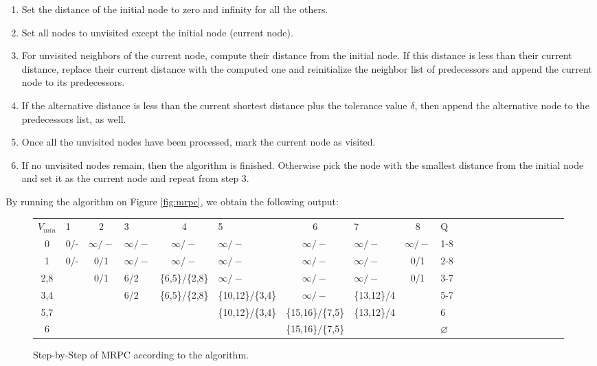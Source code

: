 \begin{enumerate}
 \item Set the distance of the initial node to zero and infinity for all the
others.
 \item Set all nodes to unvisited except the initial node (current node).
 \item For unvisited neighbors of the current node, compute their distance from
the initial node. If this distance is less than their current distance, replace
their current distance with the computed one and reinitialize the neighbor list
of predecessors and append the current node to its predecessors.
 \item If the alternative distance is less than the current shortest distance
plus the tolerance value $\delta$, then append the alternative node to the
predecessors list, as well.
 \item Once all the unvisited nodes have been processed, mark the current node as
visited. 
 \item If no unvisited nodes remain, then the algorithm is finished. Otherwise
pick the node with the smallest distance from the initial node and set it as the
current node and repeat from step 3.
\end{enumerate}

\pagebreak
By running the algorithm on Figure \ref{fig:mrpc}, we obtain the following
output:

\begin{figure}[htbp!]
 \begin{center}
 \setlength{\tabcolsep}{.5pt}
\begin{tabular*}{\textwidth}{@{\extracolsep{\fill}}clclclclclclclclclclc}
$V_{min}$ & 1 & 2 & 3 & 4 & 5 & 6 & 7 & 8 & Q\\
0 & 0/- & $\infty/-$ & $\infty/-$ & $\infty/-$ & $\infty/-$ & $\infty/-$ &
$\infty/-$ & $\infty/-$ & 1-8\\
1 & 0/- & 0/1 & $\infty/-$ & $\infty/-$ & $\infty/-$ & $\infty/-$ & $\infty/-$ &
0/1 & 2-8\\
2,8 &  & 0/1 & 6/2 & \{6,5\}/\{2,8\} & $\infty/-$ & $\infty/-$ & $\infty/-$ &
0/1 & 3-7\\
3,4 &  & & 6/2 & \{6,5\}/\{2,8\} & \{10,12\}/\{3,4\} & $\infty/-$ &  \{13,12\}/4
&  & 5-7\\
5,7 &  &  &  &  & \{10,12\}/\{3,4\} & \{15,16\}/\{7,5\} & \{13,12\}/4 &  & 6\\
6 &  &  &  & &  & \{15,16\}/\{7,5\} & &  & $\varnothing$
\end{tabular*}
\end{center}
\caption{Step-by-Step of MRPC according to the algorithm.}

\end{figure}


